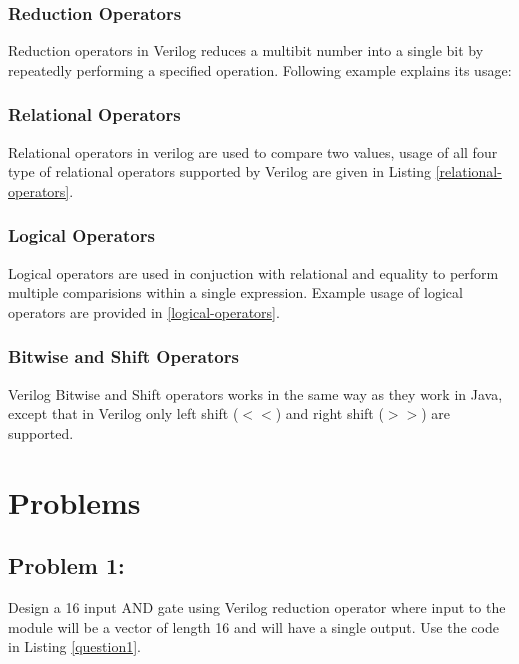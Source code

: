 \documentclass[a4paper,10pt]{article}
\theoremstyle{mytheor}
\newcommand{
  \insertverilog}[3]{
  
}
\begin{document}
\subsubsection*{Reduction Operators}
Reduction operators in Verilog reduces a multibit number into a single
bit by repeatedly performing a specified operation. Following example 
explains its usage: 
\insertverilog{./verilog_files/reductionOperators.v}{reduction-operators}{\text{Functioning of reduction operator}}
 
\subsubsection*{Relational Operators}
Relational operators in verilog are used to compare two values, usage
of all four type of relational operators supported by Verilog are
given in Listing \ref{relational-operators}.
\insertverilog{./verilog_files/relationalOperators.v}{relational-operators}{\text{Functioning of relational operator}}
  
\subsubsection*{Logical Operators}
Logical operators are used in conjuction with relational and equality
to perform multiple comparisions within a single expression.
Example usage of logical operators are provided in \ref{logical-operators}.
\insertverilog{./verilog_files/logicalOperators.v}{logical-operators}{\text{Functioning of logical operator}}

\subsubsection*{Bitwise and Shift Operators}
Verilog Bitwise and Shift operators works in the same way as they work
in Java, except that in Verilog only left shift ($<<$) and right shift
($>>$) are supported.

\section*{Problems}
\subsection*{Problem 1:}
Design a 16 input AND gate using Verilog reduction operator where input to the module will be a vector of length 16 and will have a single output.
Use the code in Listing \ref{question1}. 
\insertverilog{./verilog_files/question1.v}{question1}{\text{Question 1}}
\end{document}
